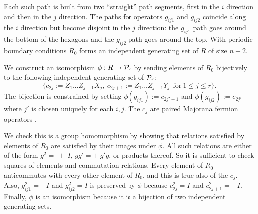 \documentclass[12pt]{article}
\begin{document}
Each such path is built from two ``straight''
path segments, first in the $i$ direction
and then in the $j$ direction. 
The paths for operators $g_{ij1}$ and
$g_{ij2}$ coincide along the $i$ direction
but become disjoint in the $j$ direction:
the $g_{ij1}$ path goes around the bottom
of the hexagons and the $g_{ij2}$ path
goes around the top.
With periodic boundary conditions $R_0$ forms an
independent generating set of $R$ of size $n-2.$

We construct an isomorphism $\phi: R\to \mathcal{P}_r$
by sending elements of $R_0$ bijectively
to the following independent generating
set of $\mathcal{P}_r$:
$$
\big\{c_{2j}:=Z_1...Z_{j-1} X_j,\ c_{2j+1}:=Z_1...Z_{j-1} Y_j\ \ \mbox{for}\ 1\le j\le r\big\}.
$$
The bijection is constrained 
by setting $\phi(g_{ij1}):=c_{2j'+1}$
and $\phi(g_{ij2}):=c_{2j'}$
where $j'$ is chosen uniquely for each $i, j.$
The $c_j$ are paired Majorana fermion operators \cite{Kitaev2006}.


We check this is a group homomorphism by showing that relations
satisfied by elements of $R_0$ are satisfied by
their images under $\phi.$
All such relations are either of the form
$g^2=~\pm~I$, $gg'=\pm~g'g$, or
products thereof.
So it is sufficient to check squares of
elements and commutation relations.
Every element of $R_0$ anticommutes with
every other element of $R_0$, and this is true also
of the $c_j.$
Also, $g_{ij1}^2=-I$ and $g_{ij2}^2=I$ 
is preserved by $\phi$ because $c_{2j}^2=I$ and $c_{2j+1}^2=-I$.
Finally, $\phi$ is an isomorphism
because it is a bijection of two independent
generating sets.
\end{document}
